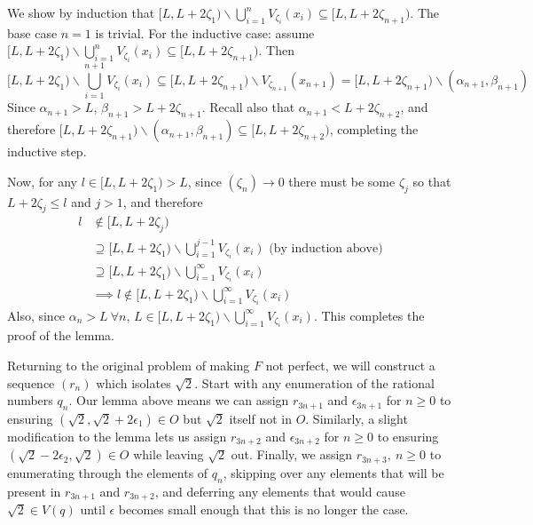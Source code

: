 \begin{solution}
{  We show by induction that \([L, L + 2\zeta_1) \backslash \bigcup^n_{i=1} V_{\zeta_i} (x_i) \subseteq [L, L + 2 \zeta_{n + 1})\). The base case \(n = 1\) is trivial. For the inductive case: assume \([L, L + 2\zeta_1) \backslash \bigcup^n_{i=1} V_{\zeta_i} (x_i) \subseteq [L, L + 2 \zeta_{n + 1})\). Then
  \[[L, L + 2\zeta_1) \backslash \bigcup^{n+1}_{i=1} V_{\zeta_i} (x_i) \subseteq [L, L + 2\zeta_{n+1}) \backslash V_{\zeta_{n+1}}(x_{n+1}) = [L, L + 2\zeta_{n+1}) \backslash (\alpha_{n+1}, \beta_{n+1})\]
  Since \(\alpha_{n+1} > L\), \(\beta_{n+1} > L + 2 \zeta_{n+1}\). Recall also that \(\alpha_{n+1} < L + 2 \zeta_{n+2}\), and therefore \([L, L + 2\zeta_{n+1}) \backslash (\alpha_{n+1}, \beta_{n+1}) \subseteq [L, L + 2 \zeta_{n+2})\), completing the inductive step.

  Now, for any \(l \in [L, L + 2 \zeta_1) > L\), since \((\zeta_n) \to 0\) there must be some \(\zeta_j\) so that \(L + 2 \zeta_j \leq l\) and \(j > 1\), and therefore
  \[
    \begin{aligned}
    l &\notin [L, L + 2 \zeta_j) \\
    & \supseteq [L, L + 2 \zeta_1) \backslash \bigcup^{j - 1}_{i=1} V_{\zeta_i} (x_i) \text{ (by induction above)}\\
    & \supseteq [L, L + 2\zeta_1) \backslash \bigcup^\infty_{i=1}V_{\zeta_i} (x_i) \\
    & \implies l \notin [L, L + 2\zeta_1) \backslash \bigcup^\infty_{i=1}V_{\zeta_i} (x_i)
    \end{aligned}
    \]
Also, since \(\alpha_n > L \  \forall n\), \(L \in [L, L + 2\zeta_1) \backslash \bigcup^\infty_{i=1}V_{\zeta_i} (x_i)\). This completes the proof of the lemma.

  Returning to the original problem of making \(F\) not perfect, we will construct a sequence \((r_n)\) which isolates \(\sqrt{2}\). Start with any enumeration of the rational numbers \(q_n\). Our lemma above means we can assign \(r_{3n + 1}\) and \(\epsilon_{3n + 1}\) for \(n \geq 0\) to ensuring \((\sqrt{2}, \sqrt{2} + 2\epsilon_1) \in O\) but \(\sqrt{2}\) itself not in \(O\). Similarly, a slight modification to the lemma lets us assign \(r_{3n + 2}\) and \(\epsilon_{3n + 2}\) for \(n \geq 0\) to ensuring \((\sqrt{2} - 2 \epsilon_2, \sqrt{2}) \in O\) while leaving \(\sqrt{2}\) out. Finally, we assign \(r_{3n+3},\ n \geq 0\) to enumerating through the elements of \(q_n\), skipping over any elements that will be present in \(r_{3n + 1}\) and \(r_{3n + 2}\), and deferring any elements that would cause \(\sqrt{2} \in V(q)\) until \(\epsilon\) becomes small enough that this is no longer the case.

}
\end{solution}
